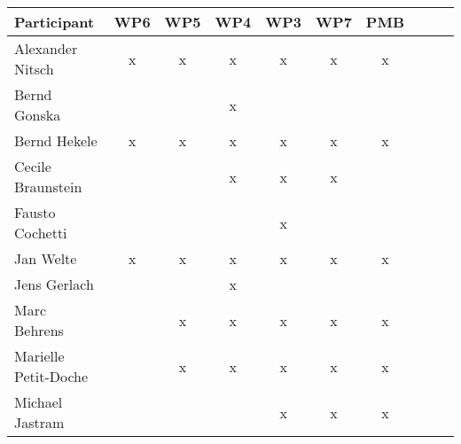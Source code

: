 \documentclass[a4paper, 11pt]{article}
\begin{document}
\begin{tabular}{|l|c|c|c||c|c|c||c|c|c|}
\hline
\textbf{Participant} & \textbf{WP6} &  \textbf{WP5} & \textbf{WP4}&  \textbf{WP3} & \textbf{WP7}&  \textbf{PMB} \\\hline
Alexander Nitsch     & x & x & x & x & x & x \\\hline  
Bernd Gonska         &   &   & x &   &   &   \\\hline
Bernd Hekele         & x & x & x & x & x & x \\\hline
Cecile Braunstein    &   &   & x & x & x &   \\\hline
Fausto Cochetti      &   &   &   & x &   &   \\\hline
Jan Welte            & x & x & x & x & x & x \\\hline
Jens Gerlach         &   &   & x &   &   &   \\\hline
Marc Behrens         &   & x & x & x & x & x \\\hline
Marielle Petit-Doche &   & x & x & x & x & x \\\hline
Michael Jastram      &   &   &   & x & x & x \\\hline

\end{tabular}
\end{document}
